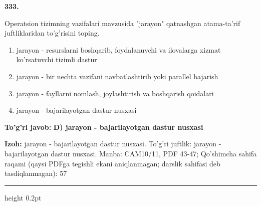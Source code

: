 \documentclass[10pt,a4paper]{article}
\begin{document}
{\bfseries\sffamily\color{ink} 333.}
\par
Operatsion tizimning vazifalari mavzusida "jarayon" qatnashgan atama-ta'rif juftliklaridan to'g'risini toping.
\begin{enumerate}[label=\Alph*),leftmargin=9mm]
\item jarayon - resurslarni boshqarib, foydalanuvchi va ilovalarga xizmat ko'rsatuvchi tizimli dastur
\item jarayon - bir nechta vazifani navbatlashtirib yoki parallel bajarish
\item jarayon - fayllarni nomlash, joylashtirish va boshqarish qoidalari
\item jarayon - bajarilayotgan dastur nusxasi
\end{enumerate}
\begin{tcolorbox}[enhanced,breakable,colback=teal!4,colframe=teal!60!black,boxrule=0.45pt,arc=1.2mm,left=2.7mm,right=2.7mm,top=1.8mm,bottom=1.8mm,before skip=2mm,after skip=2mm]
{\bfseries\sffamily\color{teal}To'g'ri javob:} \textbf{D) jarayon - bajarilayotgan dastur nusxasi}
\par\smallskip
{\bfseries Izoh:} jarayon - bajarilayotgan dastur nusxasi. To'g'ri juftlik: jarayon - bajarilayotgan dastur nusxasi. Manba: CAM10/11, PDF 43-47; Qo'shimcha sahifa raqami (qaysi PDFga tegishli ekani aniqlanmagan; darslik sahifasi deb tasdiqlanmagan): 57
\end{tcolorbox}
\vspace{2mm}\hrule height 0.2pt\vspace{3mm}
\end{document}
